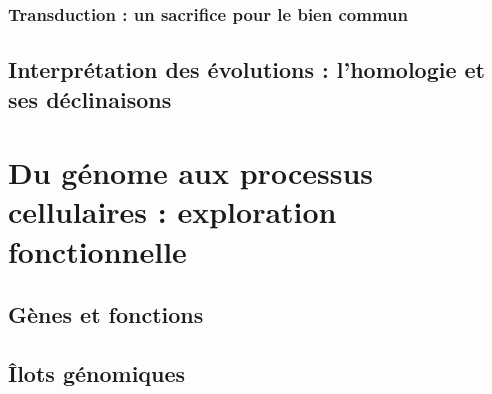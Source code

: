 \subsubsection{Transduction : un sacrifice pour le bien commun}

\subsection{Interprétation des évolutions : l'homologie et ses déclinaisons}


\section{Du génome aux processus cellulaires : exploration fonctionnelle}

\subsection{Gènes et fonctions}

\subsection{Îlots génomiques}
